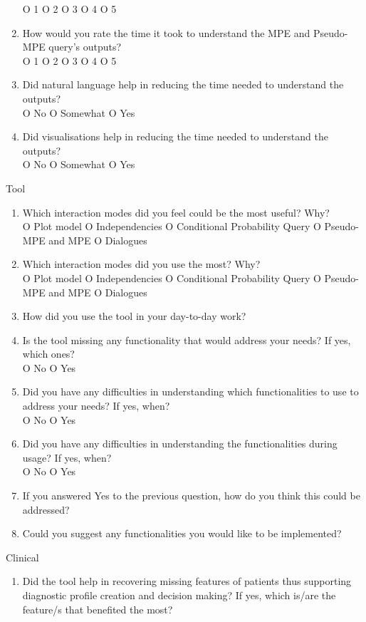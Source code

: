 \begin{framed}
\begin{enumerate}[resume]
		O 1 O 2 O 3 O 4 O 5
		\item How would you rate the time it took to understand the MPE and Pseudo-MPE query's outputs? \\
		O 1 O 2 O 3 O 4 O 5
		\item Did natural language help in reducing the time needed to understand the outputs? \\
		O No O Somewhat O Yes
		\item Did visualisations help in reducing the time needed to understand the outputs? \\
		O No O Somewhat O Yes
	\end{enumerate}
	{\Large Tool}
	\begin{enumerate}[resume]
		\item Which interaction modes did you feel could be the most useful?  Why? \\
		O Plot model O Independencies O Conditional Probability Query O Pseudo-MPE and MPE O Dialogues
		\item Which interaction modes did you use the most?  Why? \\
		O Plot model O Independencies O Conditional Probability Query O Pseudo-MPE and MPE O Dialogues
		\item How did you use the tool in your day-to-day work?
		\item Is the tool missing any functionality that would address your needs?  If yes, which ones? \\
		O No O Yes
		\item Did you have any difficulties in understanding which functionalities to use to address your needs?  If yes, when? \\
		O No O Yes
		\item Did you have any difficulties in understanding the functionalities during usage?  If yes, when? \\
		O No O Yes
		\item If you answered Yes to the previous question, how do you think this could be addressed?
		\item Could you suggest any functionalities you would like to be implemented?
	\end{enumerate}
	{\Large Clinical}
	\begin{enumerate}[resume]
		\item Did the tool help in recovering missing features of patients thus supporting diagnostic profile creation and decision making? If yes, which is/are the feature/s that benefited the most? \\

\end{enumerate}
\end{framed}
